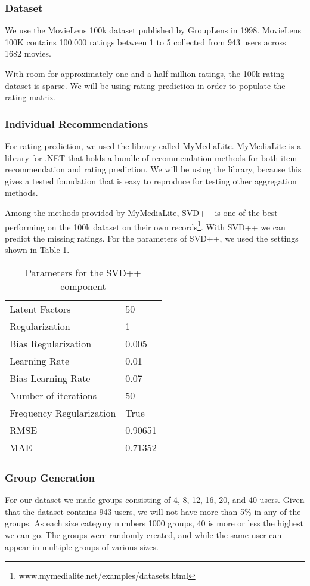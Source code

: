 \subsubsection{Dataset}\label{sec:dataset}
We use the MovieLens 100k dataset published by GroupLens in 1998\cite{movielens100k}. MovieLens 100K contains 100.000 ratings between 1 to 5 collected from 943 users across 1682 movies.

With room for approximately one and a half million ratings, the 100k rating dataset is sparse. We will be using rating prediction in order to populate the rating matrix.

\subsubsection{Individual Recommendations}\label{sec:individualrecommendation}
For rating prediction, we used the library called MyMediaLite\cite{mymedialite}. MyMediaLite is a library for .NET that holds a bundle of recommendation methods for both item recommendation and rating prediction. We will be using the library, because this gives a tested foundation that is easy to reproduce for testing other aggregation methods.

Among the methods provided by MyMediaLite, SVD++ is one of the best performing on the 100k dataset on their own records\footnote{www.mymedialite.net/examples/datasets.html}. With SVD++ we can predict the missing ratings. For the parameters of SVD++, we used the settings shown in Table \ref{tbl:svdpp}.

\begin{table}[H]
	\centering
	\begin{tabular}{|l|l|}\hline
		Latent Factors & 50 \\
		Regularization & 1	\\
		Bias Regularization & 0.005	\\
		Learning Rate & 0.01 \\
		Bias Learning Rate & 0.07 \\ 
		Number of iterations & 50 \\
		Frequency Regularization & True \\ 
		RMSE & 0.90651 \\
		MAE & 0.71352 \\ \hline
	\end{tabular}
	\caption{Parameters for the SVD++ component}
	\label{tbl:svdpp}
\end{table}

\subsubsection{Group Generation}\label{sec:groupgeneration}
For our dataset we made groups consisting of 4, 8, 12, 16, 20, and 40 users. Given that the dataset contains 943 users, we will not have more than 5\% in any of the groups. As each size category numbers 1000 groups, 40 is more or less the highest we can go. The groups were randomly created, and while the same user can appear in multiple groups of various sizes.